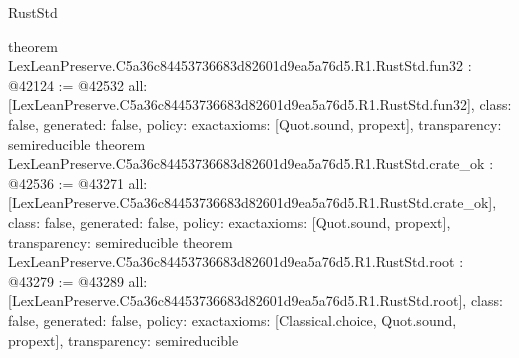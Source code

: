 \begin{lexlean}{RustStd}
\begin{coremodule}
{}
theorem LexLeanPreserve.C5a36c84453736683d82601d9ea5a76d5.R1.RustStd.fun32 : @42124 := @42532 {
  all: [LexLeanPreserve.C5a36c84453736683d82601d9ea5a76d5.R1.RustStd.fun32],
  class: false,
  generated: false,
  policy: exact{axioms: [Quot.sound, propext]},
  transparency: semireducible
}
theorem LexLeanPreserve.C5a36c84453736683d82601d9ea5a76d5.R1.RustStd.crate_ok : @42536 := @43271 {
  all: [LexLeanPreserve.C5a36c84453736683d82601d9ea5a76d5.R1.RustStd.crate_ok],
  class: false,
  generated: false,
  policy: exact{axioms: [Quot.sound, propext]},
  transparency: semireducible
}
theorem LexLeanPreserve.C5a36c84453736683d82601d9ea5a76d5.R1.RustStd.root : @43279 := @43289 {
  all: [LexLeanPreserve.C5a36c84453736683d82601d9ea5a76d5.R1.RustStd.root],
  class: false,
  generated: false,
  policy: exact{axioms: [Classical.choice, Quot.sound, propext]},
  transparency: semireducible
}


\end{coremodule}
\end{lexlean}
